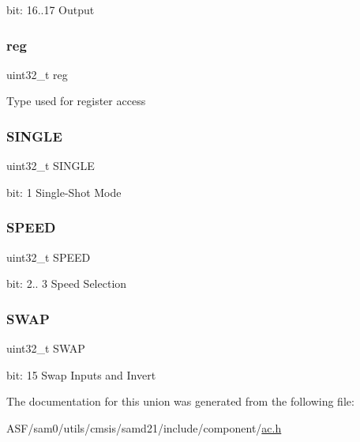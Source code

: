 bit\+: 16..17 Output \mbox{\label{union_a_c___c_o_m_p_c_t_r_l___type_a6b91636401516a477989a336376d7b40}} 
\subsubsection{\texorpdfstring{reg}{reg}}
{\footnotesize\ttfamily uint32\+\_\+t reg}

Type used for register access \mbox{\label{union_a_c___c_o_m_p_c_t_r_l___type_a2c4b6a0d40a2cfd1999066ec5266d157}} 
\subsubsection{\texorpdfstring{SINGLE}{SINGLE}}
{\footnotesize\ttfamily uint32\+\_\+t S\+I\+N\+G\+LE}

bit\+: 1 Single-\/\+Shot Mode \mbox{\label{union_a_c___c_o_m_p_c_t_r_l___type_ac9b7e20ad3da84dff4e0cdd8bf58e4a3}} 
\subsubsection{\texorpdfstring{SPEED}{SPEED}}
{\footnotesize\ttfamily uint32\+\_\+t S\+P\+E\+ED}

bit\+: 2.. 3 Speed Selection \mbox{\label{union_a_c___c_o_m_p_c_t_r_l___type_a1b62068dd035ccd5f17ab503f8c2ac66}} 
\subsubsection{\texorpdfstring{SWAP}{SWAP}}
{\footnotesize\ttfamily uint32\+\_\+t S\+W\+AP}

bit\+: 15 Swap Inputs and Invert 

The documentation for this union was generated from the following file\+:\begin{DoxyCompactItemize}
\item 
A\+S\+F/sam0/utils/cmsis/samd21/include/component/\mbox{\hyperlink{component_2ac_8h}{ac.\+h}}\end{DoxyCompactItemize}
